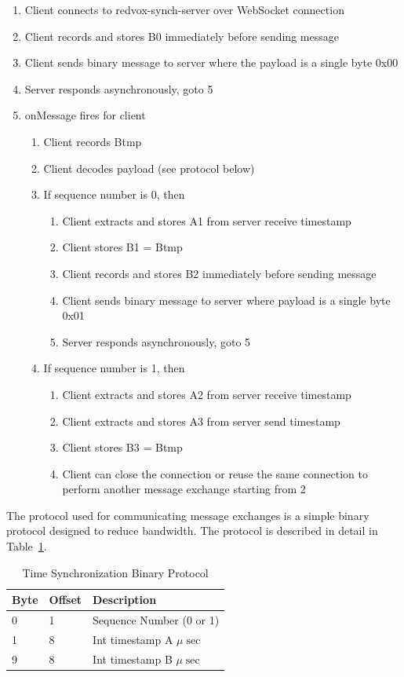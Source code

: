 \begin{enumerate}
	\item Client connects to redvox-synch-server over WebSocket connection
	\item Client records and stores B0 immediately before sending message
	\item Client sends binary message to server where the payload is a single byte 0x00
	\item Server responds asynchronously, goto 5
	\item onMessage fires for client
	\begin{enumerate}
		\item Client records Btmp
		\item Client decodes payload (see protocol below)
		\item If sequence number is 0, then
		\begin{enumerate}
			\item Client extracts and stores A1 from server receive timestamp
			\item Client stores B1 = Btmp
			\item Client records and stores B2 immediately before sending message
			\item Client sends binary message to server where payload is a single byte 0x01
			\item Server responds asynchronously, goto 5
		\end{enumerate}
		\item If sequence number is 1, then
		\begin{enumerate}
			\item Client extracts and stores A2 from server receive timestamp
			\item Client extracts and stores A3 from server send timestamp
			\item Client stores B3 = Btmp
			\item Client can close the connection or reuse the same connection to perform another message exchange starting from 2
		\end{enumerate}
	\end{enumerate}
\end{enumerate}

The protocol used for communicating message exchanges is a simple binary protocol designed to reduce bandwidth. The protocol is described in detail in Table~\ref{table:syncproto}.

\begin{table}[H]
	\centering
	\caption{Time Synchronization Binary Protocol}
	\begin{tabularx}{\textwidth}{llX}
		\toprule
		\textbf{Byte} & \textbf{Offset} & \textbf{Description} \\
		\midrule
		0 & 1 & Sequence Number (0 or 1) \\
		1 &  8 & Int timestamp A $\mu\sec$  \\
		9 & 8 & Int timestamp B $\mu\sec$ \\
		\bottomrule
	\end{tabularx}
	\label{table:syncproto}
\end{table}


